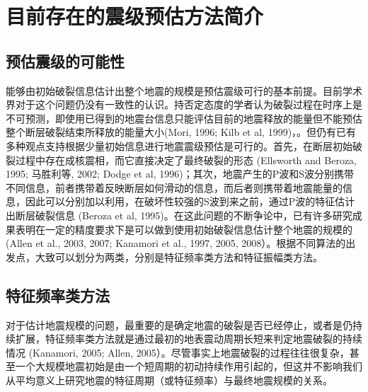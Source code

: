 
\chapter{目前存在的震级预估方法简介}

\section{预估震级的可能性}

\indent 能够由初始破裂信息估计出整个地震的规模是预估震级可行的基本前提。目前学术界对于这个问题仍没有一致性的认识。持否定态度的学者认为破裂过程在时序上是不可预测，即使用已得到的地震台信息只能评估目前的地震释放的能量但不能预估整个断层破裂结束所释放的能量大小(Mori, 1996; Kilb et al, 1999)，。但仍有已有多种观点支持根据少量初始信息进行地震震级预估是可行的。首先，在断层初始破裂过程中存在成核震相，而它直接决定了最终破裂的形态 (Ellsworth and Beroza, 1995; 马胜利等, 2002; Dodge et al, 1996)；其次，地震产生的P波和S波分别携带不同信息，前者携带着反映断层如何滑动的信息，而后者则携带着地震能量的信息，因此可以分别加以利用，在破坏性较强的S波到来之前，通过P波的特征估计出断层破裂信息 (Beroza et al, 1995)。在这此问题的不断争论中，已有许多研究成果表明在一定的精度要求下是可以做到使用初始破裂信息估计整个地震的规模的 (Allen et al., 2003, 2007; Kanamori et al., 1997, 2005, 2008）。根据不同算法的出发点，大致可以划分为两类，分别是特征频率类方法和特征振幅类方法。\\

\section{特征频率类方法}
\indent 对于估计地震规模的问题，最重要的是确定地震的破裂是否已经停止，或者是仍持续扩展，特征频率类方法就是通过最初的地表震动周期长短来判定地震破裂的持续情况 (Kanamori, 2005; Allen, 2005）。尽管事实上地震破裂的过程往往很复杂，甚至一个大规模地震初始是由一个短周期的初动持续作用引起的，但这并不影响我们从平均意义上研究地震的特征周期（或特征频率）与最终地震规模的关系。\\

